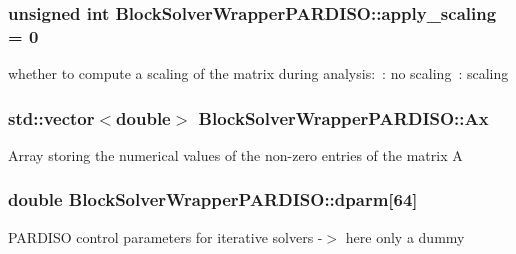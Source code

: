 \subsubsection[{\texorpdfstring{apply\+\_\+scaling}{apply_scaling}}]{\setlength{\rightskip}{0pt plus 5cm}unsigned int Block\+Solver\+Wrapper\+P\+A\+R\+D\+I\+S\+O\+::apply\+\_\+scaling = 0}\hypertarget{class_block_solver_wrapper_p_a_r_d_i_s_o_aba68acd666b7c5c41af207eb77db201c}{}\label{class_block_solver_wrapper_p_a_r_d_i_s_o_aba68acd666b7c5c41af207eb77db201c}
whether to compute a scaling of the matrix during analysis\+:~\+: no scaling~\+: scaling 
\subsubsection[{\texorpdfstring{Ax}{Ax}}]{\setlength{\rightskip}{0pt plus 5cm}std\+::vector$<$double$>$ Block\+Solver\+Wrapper\+P\+A\+R\+D\+I\+S\+O\+::\+Ax\hspace{0.3cm}{\ttfamily [private]}}\hypertarget{class_block_solver_wrapper_p_a_r_d_i_s_o_ad32493c27639c20286aea67e702f3442}{}\label{class_block_solver_wrapper_p_a_r_d_i_s_o_ad32493c27639c20286aea67e702f3442}
Array storing the numerical values of the non-\/zero entries of the matrix A 
\subsubsection[{\texorpdfstring{dparm}{dparm}}]{\setlength{\rightskip}{0pt plus 5cm}double Block\+Solver\+Wrapper\+P\+A\+R\+D\+I\+S\+O\+::dparm\mbox{[}64\mbox{]}\hspace{0.3cm}{\ttfamily [private]}}\hypertarget{class_block_solver_wrapper_p_a_r_d_i_s_o_aa158c35f9486dc043bf3485da3dec8d4}{}\label{class_block_solver_wrapper_p_a_r_d_i_s_o_aa158c35f9486dc043bf3485da3dec8d4}
P\+A\+R\+D\+I\+SO control parameters for iterative solvers -\/$>$ here only a dummy 
